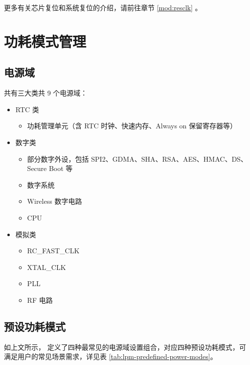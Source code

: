 \documentclass[main\_\_CN.tex]{subfiles}
\begin{document}
\begin{tiplisting}
更多有关芯片复位和系统复位的介绍，请前往章节 \ref{mod:resclk} \textit{}。
\end{tiplisting}

\section{功耗模式管理}

\subsection{电源域}\label{sec:lpm-power-domain}

\chipname{}  共有三大类共 9 个电源域：
\begin{itemize}
\item RTC 类
\begin{itemize}
\item 功耗管理单元（含 RTC 时钟、快速内存、Always on 保留寄存器等）
\end{itemize}
\item 数字类
\begin{itemize}
\item 部分数字外设，包括 SPI2、GDMA、SHA、RSA、AES、HMAC、DS、Secure Boot 等
\item 数字系统
\item Wireless 数字电路
\item CPU
\end{itemize}
\item 模拟类
\begin{itemize}
\item RC\_FAST\_CLK 
\item XTAL\_CLK
\item PLL
\item RF 电路
\end{itemize}
\end{itemize}

\subsection{预设功耗模式}
如上文所示，\chipname{}  定义了四种最常见的电源域设置组合，对应四种预设功耗模式，可满足用户的常见场景需求，详见表 \ref{tab:lpm-predefined-power-modes}。
\end{document}
